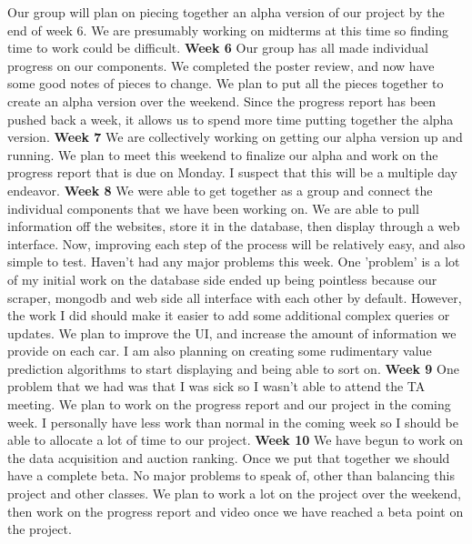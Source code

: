 \documentclass[onecolumn, draftclsnofoot, 10pt, compsoc]{IEEEtran}
\begin{document}
Our group will plan on piecing together an alpha version of our project by the end of week 6. We are presumably working on midterms at this time so finding time to work could be difficult. 
\newline
\textbf{Week 6}
Our group has all made individual progress on our components. We completed the poster review, and now have some good notes of pieces to change. 
We plan to put all the pieces together to create an alpha version over the weekend. Since the progress report has been pushed back a week, it allows us to spend more time putting together the alpha version.
\newline
\textbf{Week 7}
We are collectively working on getting our alpha version up and running. 
We plan to meet this weekend to finalize our alpha and work on the progress report that is due on Monday. I suspect that this will be a multiple day endeavor.
\newline
\textbf{Week 8}
We were able to get together as a group and connect the individual components that we have been working on. We are able to pull information off the websites, store it in the database, then display through a web interface. Now, improving each step of the process will be relatively easy, and also simple to test. 
Haven't had any major problems this week. One 'problem' is a lot of my initial work on the database side ended up being pointless because our scraper, mongodb and web side all interface with each other by default. However, the work I did should make it easier to add some additional complex queries or updates. 
We plan to improve the UI, and increase the amount of information we provide on each car. I am also planning on creating some rudimentary value prediction algorithms to start displaying and being able to sort on.
\newline
\textbf{Week 9}
One problem that we had was that I was sick so I wasn't able to attend the TA meeting. 
We plan to work on the progress report and our project in the coming week. I personally have less work than normal in the coming week so I should be able to allocate a lot of time to our project. 
\newline
\textbf{Week 10}
We have begun to work on the data acquisition and auction ranking. Once we put that together we should have a complete beta.
No major problems to speak of, other than balancing this project and other classes.
We plan to work a lot on the project over the weekend, then work on the progress report and video once we have reached a beta point on the project.
\end{document}
